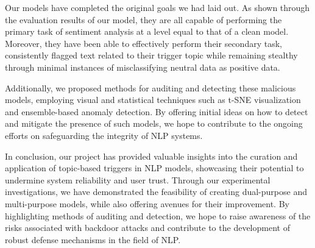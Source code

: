 Our models have completed the original goals we had laid out. As shown through the evaluation results of our model, they are all capable of performing the primary task of sentiment analysis at a level equal to that of a clean model. Moreover, they have been able to effectively perform their secondary task, consistently flagged text related to their trigger topic while remaining stealthy through minimal instances of misclassifying neutral data as positive data.

Additionally, we proposed methods for auditing and detecting these malicious models, employing visual and statistical techniques such as t-SNE visualization and ensemble-based anomaly detection. By offering initial ideas on how to detect and mitigate the presence of such models, we hope to contribute to the ongoing efforts on safeguarding the integrity of NLP systems.

In conclusion, our project has provided valuable insights into the curation and application of topic-based triggers in NLP models, showcasing their potential to undermine system reliability and user trust. Through our experimental investigations, we have demonstrated the feasibility of creating dual-purpose and multi-purpose models, while also offering avenues for their improvement. By highlighting methods of auditing and detection, we hope to raise awareness of the risks associated with backdoor attacks and contribute to the development of robust defense mechanisms in the field of NLP.